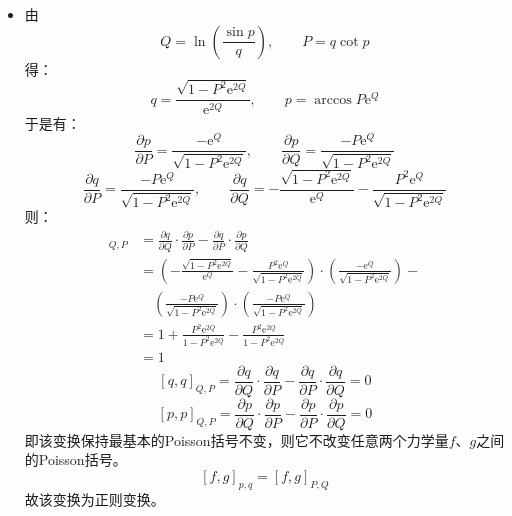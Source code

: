 \documentclass[a4paper,fontset=windows]{ctexart}
\begin{document}
\begin{itemize}
        \item[7.3.(1)]
        由
        \[
        Q = \ln\left(\frac{\sin p}{q}\right),\qquad P = q\cot p
        \]
        得：
        \[
        q = \frac{\sqrt{1-P^2\mathrm{e}^{2Q}}}{\mathrm{e}^{2Q}},\qquad p = \arccos{P\mathrm{e}^Q}
        \]
        于是有：
        \[
        \frac{\partial p}{\partial P} = \frac{-\mathrm{e}^Q}{\sqrt{1-P^2\mathrm{e}^{2Q}}},\qquad \frac{\partial p}{\partial Q} = \frac{-P\mathrm{e}^Q}{\sqrt{1-P^2\mathrm{e}^{2Q}}}
        \]
        \[
        \frac{\partial q}{\partial P} = \frac{-P\mathrm{e}^Q}{\sqrt{1-P^2\mathrm{e}^{2Q}}},\qquad \frac{\partial q}{\partial Q} = -\frac{\sqrt{1-P^2\mathrm{e}^{2Q}}}{\mathrm{e}^Q} - \frac{P^2\mathrm{e}^Q}{\sqrt{1-P^2\mathrm{e}^{2Q}}}
        \]
        则：
        \begin{align*}
            [q,p]_{Q,P}
            &= \frac{\partial q}{\partial Q}\cdot\frac{\partial p}{\partial P} - \frac{\partial q}{\partial P}\cdot\frac{\partial p}{\partial Q} \\
            &= \left(-\frac{\sqrt{1-P^2\mathrm{e}^{2Q}}}{\mathrm{e}^Q} - \frac{P^2\mathrm{e}^Q}{\sqrt{1-P^2\mathrm{e}^{2Q}}}\right)\cdot\left(\frac{-\mathrm{e}^Q}{\sqrt{1-P^2\mathrm{e}^{2Q}}}\right) - \\
            &\quad\left(\frac{-P\mathrm{e}^Q}{\sqrt{1-P^2\mathrm{e}^{2Q}}}\right)\cdot\left(\frac{-P\mathrm{e}^Q}{\sqrt{1-P^2\mathrm{e}^{2Q}}}\right) \\
            &= 1 + \frac{P^2\mathrm{e}^{2Q}}{1-P^2\mathrm{e}^{2Q}} - \frac{P^2\mathrm{e}^{2Q}}{1-P^2\mathrm{e}^{2Q}} \\
            &= 1
        \end{align*}
        \[
        [q,q]_{Q,P} = \frac{\partial q}{\partial Q}\cdot\frac{\partial q}{\partial P} - \frac{\partial q}{\partial P}\cdot\frac{\partial q}{\partial Q} = 0
        \]
        \[
        [p,p]_{Q,P} = \frac{\partial p}{\partial Q}\cdot\frac{\partial p}{\partial P} - \frac{\partial p}{\partial P}\cdot\frac{\partial p}{\partial Q} = 0
        \]
        即该变换保持最基本的Poisson括号不变，则它不改变任意两个力学量$f$、$g$之间的Poisson括号。
        \[
        [f,g]_{p,q} = [f,g]_{P,Q}
        \]
        故该变换为正则变换。
        \medskip


\end{itemize}
\end{document}

